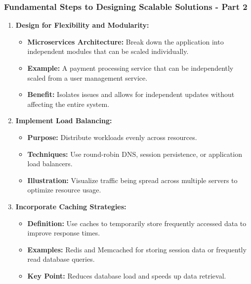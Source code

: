 \documentclass[aspectratio=169]{beamer}
\begin{document}
\begin{frame}[fragile]
    \frametitle{Fundamental Steps to Designing Scalable Solutions - Part 2}
    \begin{enumerate}[resume]
        \item \textbf{Design for Flexibility and Modularity:}
            \begin{itemize}
                \item \textbf{Microservices Architecture:} Break down the application into independent modules that can be scaled individually.
                \item \textbf{Example:} A payment processing service that can be independently scaled from a user management service.
                \item \textbf{Benefit:} Isolates issues and allows for independent updates without affecting the entire system.
            \end{itemize}
        
        \item \textbf{Implement Load Balancing:}
            \begin{itemize}
                \item \textbf{Purpose:} Distribute workloads evenly across resources.
                \item \textbf{Techniques:} Use round-robin DNS, session persistence, or application load balancers.
                \item \textbf{Illustration:} Visualize traffic being spread across multiple servers to optimize resource usage.
            \end{itemize}

        \item \textbf{Incorporate Caching Strategies:}
            \begin{itemize}
                \item \textbf{Definition:} Use caches to temporarily store frequently accessed data to improve response times.
                \item \textbf{Examples:} Redis and Memcached for storing session data or frequently read database queries.
                \item \textbf{Key Point:} Reduces database load and speeds up data retrieval.
            \end{itemize}
    \end{enumerate}
\end{frame}
\end{document}
